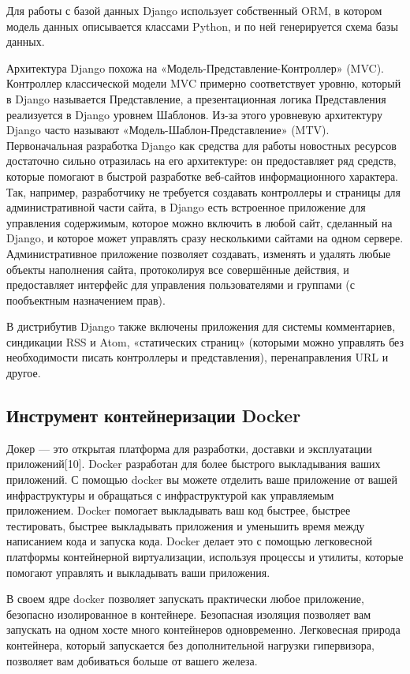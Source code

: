 Для работы с базой данных Django использует собственный ORM, в котором модель данных описывается классами Python, и по ней генерируется схема базы данных.

Архитектура Django похожа на «Модель-Представление-Контроллер» (MVC).
Контроллер классической модели MVC примерно соответствует уровню, который в Django называется Представление, а презентационная логика Представления реализуется в Django уровнем Шаблонов.
Из-за этого уровневую архитектуру Django часто называют «Модель-Шаблон-Представление» (MTV).
Первоначальная разработка Django как средства для работы новостных ресурсов достаточно сильно отразилась на его архитектуре: он предоставляет ряд средств, которые помогают в быстрой разработке веб-сайтов информационного характера.
Так, например, разработчику не требуется создавать контроллеры и страницы для административной части сайта, в Django есть встроенное приложение для управления содержимым, которое можно включить в любой сайт, сделанный на Django, и которое может управлять сразу несколькими сайтами на одном сервере.
Административное приложение позволяет создавать, изменять и удалять любые объекты наполнения сайта, протоколируя все совершённые действия, и предоставляет интерфейс для управления пользователями и группами (с пообъектным назначением прав).

В дистрибутив Django также включены приложения для системы комментариев, синдикации RSS и Atom, «статических страниц» (которыми можно управлять без необходимости писать контроллеры и представления), перенаправления URL и другое.

\subsection{Инструмент контейнеризации Docker}
Докер — это открытая платформа для разработки, доставки и эксплуатации приложений[10].
Docker разработан для более быстрого выкладывания ваших приложений.
С помощью docker вы можете отделить ваше приложение от вашей инфраструктуры и обращаться с инфраструктурой как управляемым приложением.
Docker помогает выкладывать ваш код быстрее, быстрее тестировать, быстрее выкладывать приложения и уменьшить время между написанием кода и запуска кода.
Docker делает это с помощью легковесной платформы контейнерной виртуализации, используя процессы и утилиты, которые помогают управлять и выкладывать ваши приложения.

В своем ядре docker позволяет запускать практически любое приложение, безопасно изолированное в контейнере.
Безопасная изоляция позволяет вам запускать на одном хосте много контейнеров одновременно.
Легковесная природа контейнера, который запускается без дополнительной нагрузки гипервизора, позволяет вам добиваться больше от вашего железа.

